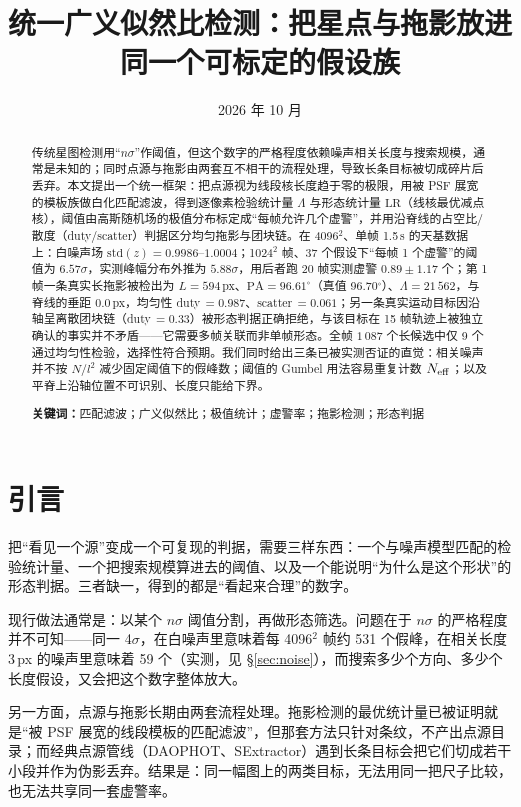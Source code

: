 \documentclass[11pt,a4paper]{ctexart}
\title{\bfseries 统一广义似然比检测：把星点与拖影放进同一个可标定的假设族}
\author{}
\date{2026 年 10 月}
\newcommand{\Lam}{\ensuremath{\Lambda}}
\begin{document}
\maketitle
\begin{abstract}
\noindent
传统星图检测用“$n\sigma$”作阈值，但这个数字的严格程度依赖噪声相关长度与搜索规模，通常是未知的；同时点源与拖影由两套互不相干的流程处理，导致长条目标被切成碎片后丢弃。本文提出一个统一框架：把点源视为线段核长度趋于零的极限，用被 PSF 展宽的模板族做白化匹配滤波，得到逐像素检验统计量 $\Lam$ 与形态统计量 $\mathrm{LR}$（线核最优减点核），阈值由高斯随机场的极值分布标定成“每帧允许几个虚警”，并用沿脊线的占空比/散度（duty/scatter）判据区分均匀拖影与团块链。在 4096$^2$、单帧 1.5\,s 的天基数据上：白噪声场 $\mathrm{std}(z)=0.9986$–$1.0004$；1024$^2$ 帧、37 个假设下“每帧 1 个虚警”的阈值为 $6.57\sigma$，实测峰幅分布外推为 $5.88\sigma$，用后者跑 20 帧实测虚警 $0.89\pm1.17$ 个；第 1 帧一条真实长拖影被检出为 $L=594$\,px、$\mathrm{PA}=96.61^\circ$（真值 96.70$^\circ$）、$\Lam=21\,562$，与脊线的垂距 0.0\,px，均匀性 duty\,$=0.987$、scatter\,$=0.061$；另一条真实运动目标因沿轴呈离散团块链（duty\,$=0.33$）被形态判据正确拒绝，与该目标在 15 帧轨迹上被独立确认的事实并不矛盾——它需要多帧关联而非单帧形态。全帧 $1\,087$ 个长候选中仅 9 个通过均匀性检验，选择性符合预期。我们同时给出三条已被实测否证的直觉：相关噪声并不按 $N/l^2$ 减少固定阈值下的假峰数；阈值的 Gumbel 用法容易重复计数 $N_{\rm eff}$；以及平脊上沿轴位置不可识别、长度只能给下界。
\vspace{0.6em}

\noindent\textbf{关键词：}匹配滤波；广义似然比；极值统计；虚警率；拖影检测；形态判据
\end{abstract}

\section{引言}
把“看见一个源”变成一个可复现的判据，需要三样东西：一个与噪声模型匹配的检验统计量、一个把搜索规模算进去的阈值、以及一个能说明“为什么是这个形状”的形态判据。三者缺一，得到的都是“看起来合理”的数字。

现行做法通常是：以某个 $n\sigma$ 阈值分割，再做形态筛选。问题在于 $n\sigma$ 的严格程度并不可知——同一 4$\sigma$，在白噪声里意味着每 4096$^2$ 帧约 531 个假峰，在相关长度 3\,px 的噪声里意味着 59 个（实测，见 §\ref{sec:noise}），而搜索多少个方向、多少个长度假设，又会把这个数字整体放大。

另一方面，点源与拖影长期由两套流程处理。拖影检测的最优统计量已被证明就是“被 PSF 展宽的线段模板的匹配滤波”\cite{nir2018}，但那套方法只针对条纹，不产出点源目录；而经典点源管线（DAOPHOT\cite{stetson1987}、SExtractor\cite{bertin1996}）遇到长条目标会把它们切成若干小段并作为伪影丢弃。结果是：同一幅图上的两类目标，无法用同一把尺子比较，也无法共享同一套虚警率。
\end{document}
